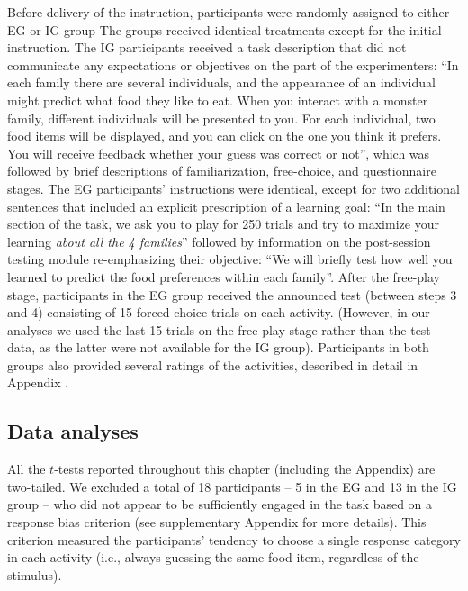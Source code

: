Before delivery of the instruction, participants were randomly assigned to either \ac{EG} or \ac{IG} group The groups received identical treatments except for the initial instruction. The \ac{IG} participants received a task description that did not communicate any expectations or objectives on the part of the experimenters: “In each family there are several individuals, and the appearance of an individual might predict what food they like to eat. When you interact with a monster family, different individuals will be presented to you. For each individual, two food items will be displayed, and you can click on the one you think it prefers. You will receive feedback whether your guess was correct or not”, which was followed by brief descriptions of familiarization, free-choice, and questionnaire stages. The \ac{EG} participants’ instructions were identical, except for two additional sentences that included an explicit prescription of a learning goal: “In the main section of the task, we ask you to play for 250 trials and try to maximize your learning \textit{about all the 4 families}” followed by information on the post-session testing module re-emphasizing their objective: “We will briefly test how well you learned to predict the food preferences within each family”. After the free-play stage, participants in the \ac{EG} group received the announced test (between steps 3 and 4) consisting of 15 forced-choice trials on each activity. (However, in our analyses we used the last 15 trials on the free-play stage rather than the test data, as the latter were not available for the \ac{IG} group). Participants in both groups also provided several ratings of the activities, described in detail in Appendix .

\subsection{Data analyses}\label{CH4_SSS_computational_modeling}
All the $t$-tests reported throughout this chapter (including the Appendix) are two-tailed. We excluded a total of 18 participants -- 5 in the \ac{EG} and 13 in the \ac{IG} group -- who did not appear to be sufficiently engaged in the task based on a response bias criterion (see supplementary Appendix  for more details). This criterion measured the participants' tendency to choose a single response category in each activity (i.e., always guessing the same food item, regardless of the stimulus).
     
